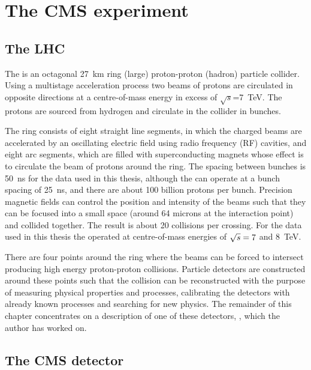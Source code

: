 \chapter{The CMS experiment}
\label{chap:cms}

\section{The LHC}

The \LHC is an octagonal 27~km ring (large) proton-proton (hadron) particle collider. Using a multistage acceleration process two beams of protons are circulated in opposite directions at a centre-of-mass energy in excess of $\sqrt{s}$=7~TeV. The protons are sourced from hydrogen and circulate in the collider in bunches.  


The \LHC ring consists of eight straight line segments, in which the charged beams are accelerated by an oscillating electric field using radio frequency (RF) cavities, and eight arc segments, which are filled with superconducting magnets whose effect is to circulate the beam of protons around the ring. The spacing between bunches is 50~ns for the data used in this thesis, although the \LHC can operate at a bunch spacing of 25~ns, and there are about 100 billion protons per bunch. Precision magnetic fields can control the position and intensity of the beams such that they can be focused into a small space (around 64 microns at the interaction point) and collided together. The result is about 20 collisions per crossing. For the data used in this thesis the \LHC operated at centre-of-mass energies of $\sqrt{s}=7$ and 8~TeV. 

There are four points around the ring where the beams can be forced to intersect producing high energy proton-proton collisions. Particle detectors are constructed around these points such that the collision can be reconstructed with the purpose of measuring physical properties and processes, calibrating the detectors with already known processes and searching for new physics. The remainder of this chapter concentrates on a description of one of these detectors, \CMS, which the author has worked on.

\section{The CMS detector}

